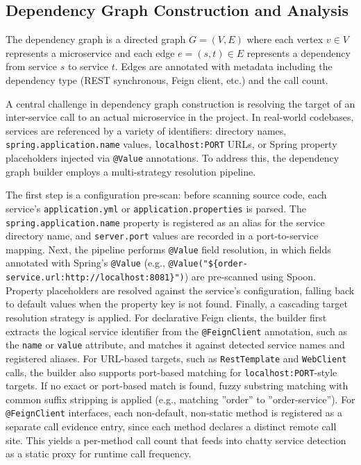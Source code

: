 \subsection{Dependency Graph Construction and Analysis}
\label{subsec:graph-analysis}

\par The dependency graph is a directed graph $G = (V, E)$ where each vertex $v \in V$ represents a microservice and each edge $e = (s, t) \in E$ represents a dependency from service $s$ to service $t$. Edges are annotated with metadata including the dependency type (REST synchronous, Feign client, etc.) and the call count.

\par A central challenge in dependency graph construction is resolving the target of an inter-service call to an actual microservice in the project. In real-world codebases, services are referenced by a variety of identifiers: directory names, \texttt{spring\-.application.name} values, \texttt{localhost:PORT} URLs, or Spring property placeholders injected via \texttt{@Value} annotations. To address this, the dependency graph builder employs a multi-strategy resolution pipeline.

\par The first step is a configuration pre-scan: before scanning source code, each service's \texttt{application.yml} or \texttt{application.properties} is parsed. The \texttt{spring\-.application.name} property is registered as an alias for the service directory name, and \texttt{server.port} values are recorded in a port-to-service mapping. Next, the pipeline performs \texttt{@Value} field resolution, in which fields annotated with Spring's \texttt{@Value} (e.g., \texttt{@Value("\$\{order\--service.url:http://localhost:8081\}")}) are pre-scanned using Spoon. Property placeholders are resolved against the service's configuration, falling back to default values when the property key is not found. Finally, a cascading target resolution strategy is applied. For declarative Feign clients, the builder first extracts the logical service identifier from the \texttt{@Feign\-Client} annotation, such as the \texttt{name} or \texttt{value} attribute, and matches it against detected service names and registered aliases. For URL-based targets, such as \texttt{Rest\-Template} and \texttt{WebClient} calls, the builder also supports port-based matching for \texttt{local\-host:PORT}-style targets. If no exact or port-based match is found, fuzzy substring matching with common suffix stripping is applied (e.g., matching ''order'' to ''order-service''). For \texttt{@FeignClient} interfaces, each non-default, non-static method is registered as a separate call evidence entry, since each method declares a distinct remote call site. This yields a per-method call count that feeds into chatty service detection as a static proxy for runtime call frequency.

